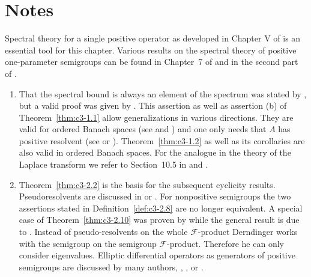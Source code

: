 \clearpage
\section*{Notes}

Spectral theory for a single positive operator as developed in Chapter V of \citet{schaefer:1974} is an essential tool for this chapter. 
Various results on the spectral theory of positive one-parameter semigroups can be found in Chapter~7 of \citet{davies:1980} and in the second part of \citet{battyrobinson:1984}.

\begin{enumerate}[label=\emph{Section \arabic*:}, wide, itemsep=1ex]
\item
That the spectral bound is always an element of the spectrum was stated by \citet{karlin:1959}, but a valid proof was given by \citet{derndinger:1980}. 
This assertion as well as assertion (b) of Theorem~\ref{thm:c3-1.1} allow generalizations in various directions.  
They are valid for ordered Banach spaces (see \citet{greinervoigtwolff:1981} and \citet{klein:1984}) and one only needs that $A$ has positive resolvent (see \citet{kato:1982} or \citet{nussbaum:1984}). 
Theorem~\ref{thm:c3-1.2} as well as its corollaries are also valid in ordered Banach spaces. 
For the analogue in the theory of the Laplace transform we refer to Section~10.5 in \citet{widder:1971} and \citet{voigt:1982}.

\item 
Theorem~\ref{thm:c3-2.2} is the basis for the subsequent cyclicity results. 
Pseudoresolvents are discussed \eg in \citet{hillephillips:1957} or \citet{yosida:1965}. 
For nonpositive semigroups the two assertions stated in Definition~\ref{def:c3-2.8} are no longer equivalent. 
A special case of Theorem~\ref{thm:c3-2.10} was proven by\citet{derndinger:1980} while the general result is due to \citet{greiner:1981}. Instead of pseudo-resolvents on the whole $\mathcal{F}$-product Derndinger works with the semigroup on the semigroup $\mathcal{F}$-product. 
Therefore he can only consider eigenvalues. 
Elliptic differential operators as generators of positive semigroups are discussed by many authors, \eg  \citet{amann:1983}, \citet{fattorini:1983}, \citet{friedman:1969} or \citet{pazy:1983}.


\end{enumerate}
